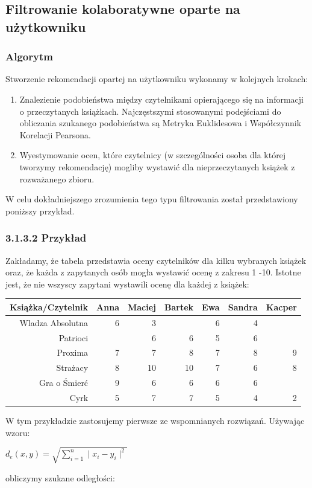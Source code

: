 \documentclass[12pt,a4paper]{report}
\begin{document}
{\subsection{Filtrowanie kolaboratywne oparte na użytkowniku}


\subsubsection{Algorytm}
Stworzenie rekomendacji opartej na użytkowniku wykonamy w kolejnych krokach:
\begin{enumerate}
\item Znalezienie podobieństwa między czytelnikami opierającego się na informacji o przeczytanych książkach. Najczęstszymi stosowanymi podejściami do obliczania szukanego podobieństwa są Metryka Euklidesowa i Współczynnik Korelacji Pearsona.
\item Wyestymowanie ocen, które czytelnicy (w szczególności osoba dla której tworzymy rekomendację) mogliby wystawić dla nieprzeczytanych książek z rozważanego zbioru.
\end{enumerate}
W celu dokładniejszego zrozumienia tego typu filtrowania został przedstawiony poniższy przykład.
\subsubsection{3.1.3.2 Przykład}
Zakładamy, że tabela przedstawia oceny czytelników dla kilku wybranych książek oraz, że każda z zapytanych osób mogła wystawić ocenę z zakresu 1 -10. Istotne jest, że nie wszyscy zapytani wystawili ocenę dla każdej z książek:
\begin{center}
\begin{tabular}{|r|r|r|r|r|r|r|} \hline
Książka/Czytelnik & Anna & Maciej & Bartek & Ewa & Sandra & Kacper \\
\hline \hline 
Wladza Absolutna & 6 & 3 & & 6 & 4 &  \\
Patrioci &  & 6 & 6 & 5 & 6 &  \\
Proxima & 7 & 7 & 8 & 7 & 8 & 9 \\
Strażacy & 8 & 10 & 10 & 7 & 6 & 8 \\
Gra o Śmierć & 9 & 6 & 6 & 6 & 6 &  \\
Cyrk & 5 & 7 & 7 & 5 & 4 & 2 \\
\hline
\end{tabular}
\end{center}
W tym przykładzie zastosujemy pierwsze ze wspomnianych rozwiązań. Używając wzoru:
\begin{center}
$d_{e}(x,y) = \sqrt{\sum_{i=1}^n \mid x_{i} - y_{i} \mid ^2 }$
\end{center}
obliczymy szukane odległości:

}
\end{document}
